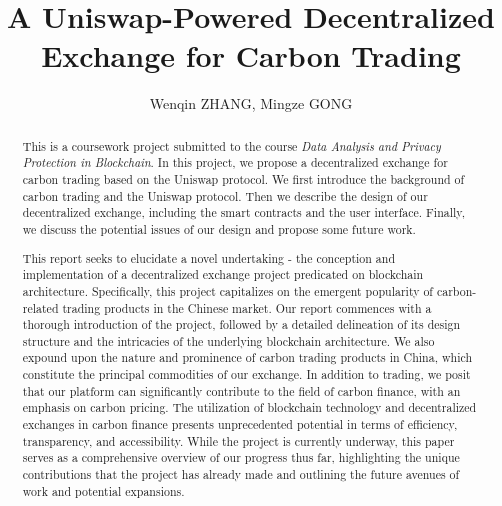 \documentclass[sigconf, authordraft]{acmart}
\begin{document}
	\title{A Uniswap-Powered Decentralized Exchange for Carbon Trading}


	\author{Wenqin ZHANG, Mingze GONG}


	\renewcommand{\shortauthors}{Trovato and Tobin, et al.}


	\begin{abstract}
		This is a coursework project submitted to the course \textit{Data Analysis and
		Privacy Protection in Blockchain}. In this project, we propose a
		decentralized exchange for carbon trading based on the Uniswap protocol. We first
		introduce the background of carbon trading and the Uniswap protocol. Then we
		describe the design of our decentralized exchange, including the smart contracts
		and the user interface. Finally, we discuss the potential issues of our design
		and propose some future work.

		This report seeks to elucidate a novel undertaking - the conception and implementation
		of a decentralized exchange project predicated on blockchain architecture.
		Specifically, this project capitalizes on the emergent popularity of carbon-related
		trading products in the Chinese market. Our report commences with a thorough
		introduction of the project, followed by a detailed delineation of its design
		structure and the intricacies of the underlying blockchain architecture. We
		also expound upon the nature and prominence of carbon trading products in
		China, which constitute the principal commodities of our exchange. In
		addition to trading, we posit that our platform can significantly contribute
		to the field of carbon finance, with an emphasis on carbon pricing. The utilization
		of blockchain technology and decentralized exchanges in carbon finance presents
		unprecedented potential in terms of efficiency, transparency, and accessibility.
		While the project is currently underway, this paper serves as a comprehensive
		overview of our progress thus far, highlighting the unique contributions
		that the project has already made and outlining the future avenues of work
		and potential expansions.
	\end{abstract}
\end{document}
